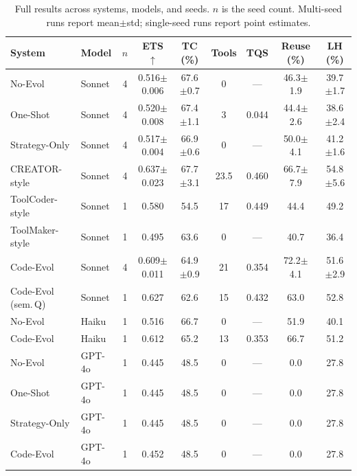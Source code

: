 \begin{table}[t]
\centering\small
\begin{tabular}{llccccccc}
\toprule
\textbf{System} & \textbf{Model} & $n$ & \textbf{ETS}$\uparrow$ & \textbf{TC (\%)} & \textbf{Tools} & \textbf{TQS} & \textbf{Reuse (\%)} & \textbf{LH (\%)} \\
\midrule
No-Evol & Sonnet & 4 & 0.516$\pm$0.006 & 67.6$\pm$0.7 & 0 & --- & 46.3$\pm$1.9 & 39.7$\pm$1.7 \\
One-Shot & Sonnet & 4 & 0.520$\pm$0.008 & 67.4$\pm$1.1 & 3 & 0.044 & 44.4$\pm$2.6 & 38.6$\pm$2.4 \\
Strategy-Only & Sonnet & 4 & 0.517$\pm$0.004 & 66.9$\pm$0.6 & 0 & --- & 50.0$\pm$4.1 & 41.2$\pm$1.6 \\
CREATOR-style & Sonnet & 4 & 0.637$\pm$0.023 & 67.7$\pm$3.1 & 23.5 & 0.460 & 66.7$\pm$7.9 & 54.8$\pm$5.6 \\
ToolCoder-style & Sonnet & 1 & 0.580 & 54.5 & 17 & 0.449 & 44.4 & 49.2 \\
ToolMaker-style & Sonnet & 1 & 0.495 & 63.6 & 0 & --- & 40.7 & 36.4 \\
Code-Evol & Sonnet & 4 & 0.609$\pm$0.011 & 64.9$\pm$0.9 & 21 & 0.354 & 72.2$\pm$4.1 & 51.6$\pm$2.9 \\
Code-Evol (sem.\,Q) & Sonnet & 1 & 0.627 & 62.6 & 15 & 0.432 & 63.0 & 52.8 \\
\midrule
No-Evol & Haiku & 1 & 0.516 & 66.7 & 0 & --- & 51.9 & 40.1 \\
Code-Evol & Haiku & 1 & 0.612 & 65.2 & 13 & 0.353 & 66.7 & 51.2 \\
\midrule
No-Evol & GPT-4o & 1 & 0.445 & 48.5 & 0 & --- & 0.0 & 27.8 \\
One-Shot & GPT-4o & 1 & 0.445 & 48.5 & 0 & --- & 0.0 & 27.8 \\
Strategy-Only & GPT-4o & 1 & 0.445 & 48.5 & 0 & --- & 0.0 & 27.8 \\
Code-Evol & GPT-4o & 1 & 0.452 & 48.5 & 0 & --- & 0.0 & 27.8 \\
\bottomrule
\end{tabular}
\caption{Full results across systems, models, and seeds. $n$ is the seed count. Multi-seed runs report mean$\pm$std; single-seed runs report point estimates.}
\label{tab:results}
\end{table}